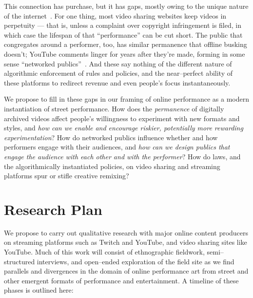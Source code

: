 \documentclass[10pt]{article}
\begin{document}
This connection has purchase, but it has gaps, mostly owing to the unique nature of the internet~\cite{miller2011understanding}.
For one thing, most video sharing websites keep videos
in perpetuity
--- that is, unless a complaint over copyright infringement is filed, in which case the lifespan of that ``performance'' can be cut short.
The public that congregates around a performer, too, has similar permanence that offline busking doesn't;
YouTube comments linger for years after they're made, forming in some sense ``networked publics''~\cite{boyd2007youth}.
And these say nothing of the different nature of algorithmic enforcement of rules and policies, and
the near--perfect ability of these platforms to redirect revenue and even people's focus instantaneously.

We propose to fill in these gaps in our framing of online performance as a modern instantiation of street performance.
How does the \textit{permanence} of digitally archived videos affect people's willingness to experiment with new formats and styles,
and \textit{how can we enable and encourage riskier, potentially more rewarding experimentation}?
How do networked publics influence whether and how performers engage with their audiences,
and \textit{how can we design publics that engage the audience with each other and with the performer}?
How do laws, and the algorithmically instantiated policies, on video sharing and streaming platforms spur or stifle creative remixing?

\section*{Research Plan}
We propose to carry out qualitative research with major online content producers
on streaming platforms such as Twitch and YouTube, and video sharing sites like YouTube.
Much of this work will consist of ethnographic fieldwork, semi--structured interviews, and
open--ended exploration of the field site as we find parallels and divergences in the domain
of online performance art from street and other emergent formats of performance and entertainment.
A timeline of these phases is outlined here:

\vspace*{5pt}
\end{document}
